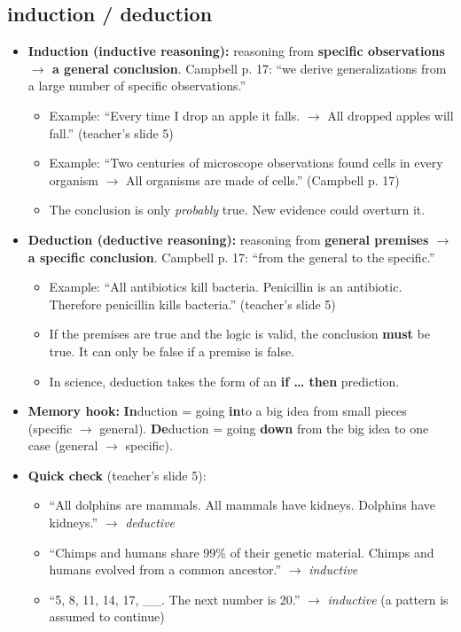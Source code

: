 \documentclass[11pt,letterpaper]{article}
\begin{document}
\subsection{induction / deduction}
\begin{itemize}
  \item \textbf{Induction (inductive reasoning):} reasoning from \textbf{specific observations $\rightarrow$ a general conclusion}. Campbell p. 17: ``we derive generalizations from a large number of specific observations.''
  \begin{itemize}
    \item Example: ``Every time I drop an apple it falls. $\rightarrow$ All dropped apples will fall.'' (teacher's slide 5)
    \item Example: ``Two centuries of microscope observations found cells in every organism $\rightarrow$ All organisms are made of cells.'' (Campbell p. 17)
    \item The conclusion is only \emph{probably} true. New evidence could overturn it.
  \end{itemize}
  \item \textbf{Deduction (deductive reasoning):} reasoning from \textbf{general premises $\rightarrow$ a specific conclusion}. Campbell p. 17: ``from the general to the specific.''
  \begin{itemize}
    \item Example: ``All antibiotics kill bacteria. Penicillin is an antibiotic. Therefore penicillin kills bacteria.'' (teacher's slide 5)
    \item If the premises are true and the logic is valid, the conclusion \textbf{must} be true. It can only be false if a premise is false.
    \item In science, deduction takes the form of an \textbf{if \dots{} then} prediction.
  \end{itemize}
  \item \textbf{Memory hook:} \textbf{In}duction = going \textbf{in}to a big idea from small pieces (specific $\rightarrow$ general). \textbf{De}duction = going \textbf{down} from the big idea to one case (general $\rightarrow$ specific).
\end{itemize}


\begin{itemize}
  \item \textbf{Quick check} (teacher's slide 5):
  \begin{itemize}
    \item ``All dolphins are mammals. All mammals have kidneys. Dolphins have kidneys.'' $\rightarrow$ \emph{deductive}
    \item ``Chimps and humans share 99\% of their genetic material. Chimps and humans evolved from a common ancestor.'' $\rightarrow$ \emph{inductive}
    \item ``5, 8, 11, 14, 17, \_\_. The next number is 20.'' $\rightarrow$ \emph{inductive} (a pattern is assumed to continue)
  \end{itemize}
\end{itemize}
\end{document}
